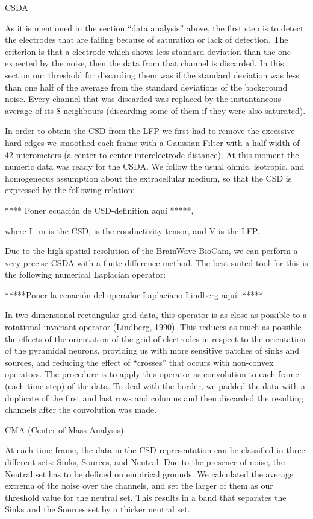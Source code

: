CSDA

 
As it is mentioned in the section ``data analysis''  above, the first step is to detect the electrodes that are failing
because of saturation or lack of detection. The criterion is that a electrode
which shows less standard deviation than the one expected by the noise, then
the data from that channel is discarded. In this section our threshold for
discarding them was if the standard deviation was less than one half of the
average from the standard deviations of the background noise.
Every channel that was discarded was replaced by the instantaneous average
of its 8 neighbours (discarding some of them if they were also saturated).

In order to obtain the CSD from the LFP we first had to remove the excessive
hard edges we smoothed each frame with a Gaussian Filter with a half-width of
42 micrometers (a center to center interelectrode distance). At this moment
the numeric data was ready for the CSDA. We follow the usual ohmic, isotropic,
and homogeneous assumption about the extracellular medium, so that
the CSD is expressed by the following relation:

**** Poner ecuación de CSD-definition aquí *****,

where I_m is the CSD, \sigma is the conductivity tensor, and V is the
LFP.

Due to the high spatial resolution of the BrainWave BioCam, we can perform a very
precise CSDA with a finite difference method. The best suited tool for this
is the following numerical Laplacian operator:

*****Poner la ecuación del operador Laplaciano-Lindberg aquí. *****

In two dimensional rectangular grid data,
this operator is as close as possible to a rotational invariant operator
(Lindberg, 1990). This reduces as much as possible the effects of the orientation
of the grid of electrodes in respect to the orientation of the pyramidal
neurons, providing us with more sensitive patches of sinks and sources,
and reducing the effect of ``crosses'' that occurs with non-convex
operators. The procedure is to apply this operator
 as convolution to each frame (each time step) of the data. To
deal with the border, we padded the data with a duplicate of the first
and last rows and columns and then discarded the resulting channels
after the convolution was made. 


CMA (Center of Mass Analysis)

At each time frame, the data in the CSD representation can be classified in 
three different sets: Sinks, Sources, and Neutral. Due to the presence of
noise, the Neutral set has to be defined on empirical grounds. We calculated
the average extrema of the noise over the channels, and set the larger of
them as our threshold value for the neutral set. This results in a band
that separates the Sinks and the Sources set by a thicker neutral set.

